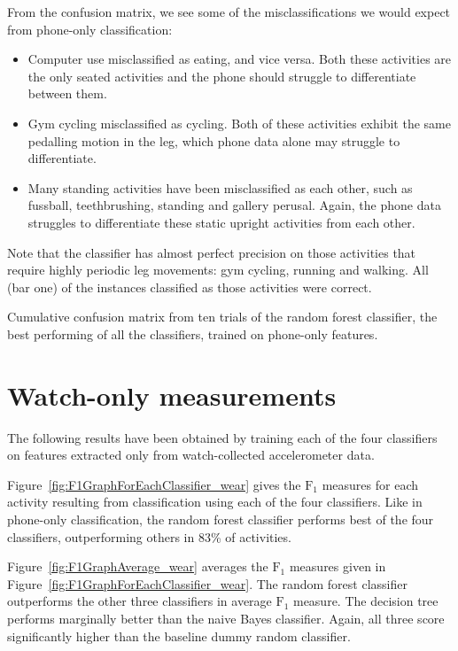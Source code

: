     From the confusion matrix, we see some of the misclassifications we would expect from phone-only classification:
    \begin{itemize}
      \item Computer use misclassified as eating, and vice versa. Both these activities are the only seated activities and the phone should struggle to differentiate between them.
      \item Gym cycling misclassified as cycling. Both of these activities exhibit the same pedalling motion in the leg, which phone data alone may struggle to differentiate.
      \item Many standing activities have been misclassified as each other, such as fussball, teethbrushing, standing and gallery perusal. Again, the phone data struggles to differentiate these static upright activities from each other.
    \end{itemize}  
    Note that the classifier has almost perfect precision on those activities that require highly periodic leg movements: gym cycling, running and walking. All (bar one) of the instances classified as those activities were correct.
    

    \begin{table}[htb]
      \tabcolsep=0.11cm
      \centering
        
      \caption{Cumulative confusion matrix from ten trials of the random forest classifier, the best performing of all the classifiers, trained on phone-only features.}
      \label{tab:ConfusionMatrix_phone_RandomForestClassifier}
    \end{table}
    
  \section{Watch-only measurements}
    The following results have been obtained by training each of the four classifiers on features extracted only from watch-collected accelerometer data.
    
    Figure~\ref{fig:F1GraphForEachClassifier_wear} gives the $\mathrm{F}_1$ measures for each activity resulting from classification using each of the four classifiers. Like in phone-only classification, the random forest classifier performs best of the four classifiers, outperforming others in 83\% of activities.
    
    Figure~\ref{fig:F1GraphAverage_wear} averages the $\mathrm{F}_1$ measures given in Figure~\ref{fig:F1GraphForEachClassifier_wear}. The random forest classifier outperforms the other three classifiers in average $\mathrm{F}_1$ measure. The decision tree performs marginally better than the naive Bayes classifier. Again, all three score significantly higher than the baseline dummy random classifier.
    
